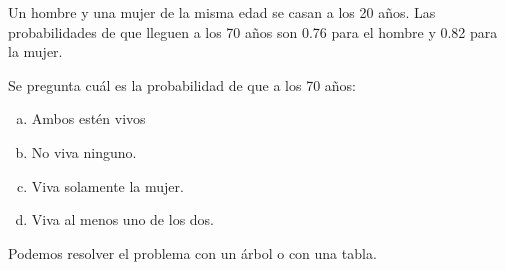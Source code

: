 \vspace{5mm}
\begin{ejemplo}
\begin{ejer}
Un hombre y una mujer de la misma edad se casan a los 20 años. Las probabilidades de que lleguen a los 70 años son 0.76 para el hombre y 0.82 para la mujer.

Se pregunta cuál es la probabilidad de que a los 70 años:
\begin{adjustwidth}{20pt}{2pt}
	\begin{enumerate}[a) ]
	\item Ambos estén vivos
	\item No viva ninguno.
	\item Viva solamente la mujer.
	\item Viva al menos uno de los dos.	
	\end{enumerate}
\end{adjustwidth}
\end{ejer}
\end{ejemplo}

Podemos resolver el problema con un árbol o con una tabla.


